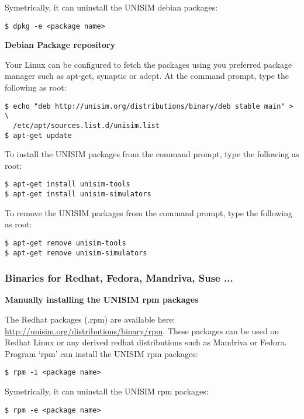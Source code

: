 Symetrically, it can uninstall the UNISIM debian packages:

\begin{verbatim}
$ dpkg -e <package name>
\end{verbatim}

\noindent \textbf{Debian Package repository}

Your Linux can be configured to fetch the packages using you preferred package manager such as apt-get, synaptic or adept.
At the command prompt, type the following as root:

\begin{verbatim}
$ echo "deb http://unisim.org/distributions/binary/deb stable main" > \
  /etc/apt/sources.list.d/unisim.list
$ apt-get update
\end{verbatim}

To install the UNISIM packages from the command prompt, type the following as root:

\begin{verbatim}
$ apt-get install unisim-tools
$ apt-get install unisim-simulators
\end{verbatim}

To remove the UNISIM packages from the command prompt, type the following as root:

\begin{verbatim}
$ apt-get remove unisim-tools
$ apt-get remove unisim-simulators
\end{verbatim}

\subsubsection{Binaries for Redhat, Fedora, Mandriva, Suse ...}

\noindent \textbf{Manually installing the UNISIM rpm packages}

The Redhat packages (.rpm) are available here: \url{http://unisim.org/distributions/binary/rpm}.
These packages can be used on Redhat Linux or any derived redhat distributions such as Mandriva or Fedora.
Program ‘rpm’ can install the UNISIM rpm packages:

\begin{verbatim}
$ rpm -i <package name>
\end{verbatim}

Symetrically, it can uninstall the UNISIM rpm packages:

\begin{verbatim}
$ rpm -e <package name>
\end{verbatim}

